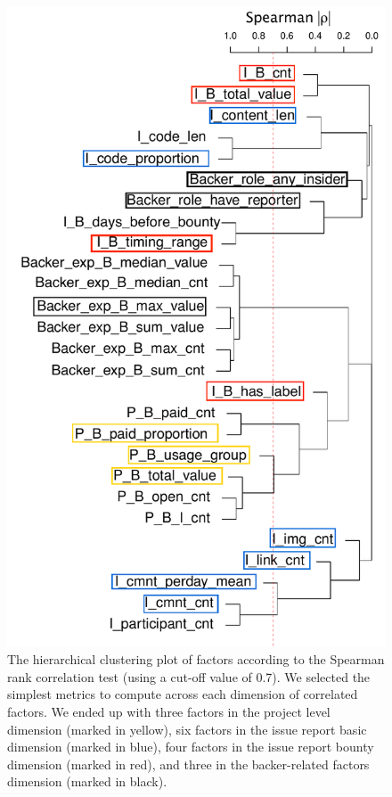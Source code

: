 \documentclass[10pt,journal,compsoc]{IEEEtran}
\begin{document}
\begin{appendices}
\begin{enumerate}
	
      \begin{figure}[t]
        \centering\includegraphics[width=\columnwidth ]{pics/rq3/rq3_hie}
        \caption{The hierarchical clustering plot of factors according to the Spearman rank correlation test (using a cut-off value of 0.7). We selected the simplest metrics to compute across each dimension of correlated factors. We ended up with three factors in the project level dimension (marked in yellow), six factors in the issue report basic dimension (marked in blue), four factors in the issue report bounty dimension  (marked in red), and three in the backer-related factors dimension (marked in black).}

\end{figure}
\end{enumerate}
\end{appendices}
\end{document}

